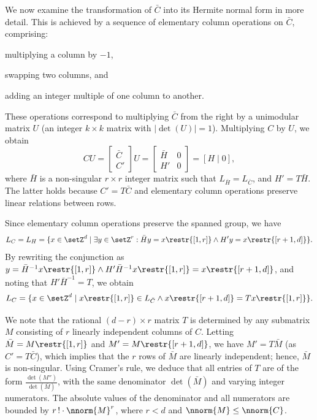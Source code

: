 We now examine the transformation of $\bar{C}$ into its Hermite normal
form in more detail. This is achieved by a sequence of elementary
column operations on $\bar{C}$, comprising: 
\begin{enumerate*}[(i)]
    \item multiplying a column by $-1$, 
    \item swapping two columns, and 
    \item adding an integer multiple of one column to another.
\end{enumerate*}
These operations correspond to multiplying $\bar{C}$ from the right by a unimodular matrix $U$ (an integer $k \times k$ matrix with $|\det(U)| = 1$). Multiplying $C$ by $U$, we obtain
\[
	CU = \begin{bmatrix} \bar{C} \\ C' \end{bmatrix} U = 
		\begin{bmatrix} \bar{H} & 0 \\ H' & 0 \end{bmatrix} = [H \mid 0],
\]
where $\bar{H}$ is a non-singular $r \times r$ integer matrix such
that $L_{\bar{H}}
= L_{\bar{C}}$, and $H' = T\bar{H}$. The latter holds because $C' = T\bar{C}$ and elementary column operations preserve linear relations between rows.

Since elementary column operations preserve the spanned group, we have
\[
    L_{C} = L_{H} = \{x \in \setZ^d \mid \exists y \in
    \setZ^r : \bar{H}y = x\restr{[1,r]} \land H'y = x\restr{[r+1,d]}\}.
\]
By rewriting the conjunction as $y = \bar{H}^{-1}x\restr{[1,r]}\land
H'\bar{H}^{-1}x\restr{[1,r]} = x\restr{[r+1,d]}$, and noting that
$H'\bar{H}^{-1} = T$, we obtain
\begin{equation}\label{eq:LbarC}
	L_{C}=\{x\in\setZ^d\mid x\restr{[1,r]}\in L_{\bar{C}}\land
x\restr{[r+1,d]}=T x\restr{[1,r]}\}.
\end{equation}

\noindent
We note that the rational $(d{-}r)\times r$ matrix $T$ is determined
by any submatrix $M$ consisting of 
$r$ linearly independent columns of $C$.
Letting
$\bar{M}=M\restr{[1,r]}$
and $M'=M\restr{[r+1,d]}$, we have $M'=T\bar{M}$ (as $C'=T\bar{C}$), which
implies that the $r$ rows of $\bar{M}$ are linearly independent;
hence, $\bar{M}$
is non-singular.
 Using Cramer's rule,
we deduce that all entries of $T$ are of the form
$\frac{\det(M'')}{\det(\bar{M})}$, with the same denominator
$\det(\bar{M})$ and
varying integer numerators. The absolute values of the denominator and all numerators are
bounded by $r\,!\cdot \nnorm{M}^r$, where $r<d$ and $\nnorm{M}\leq \nnorm{C}$.

